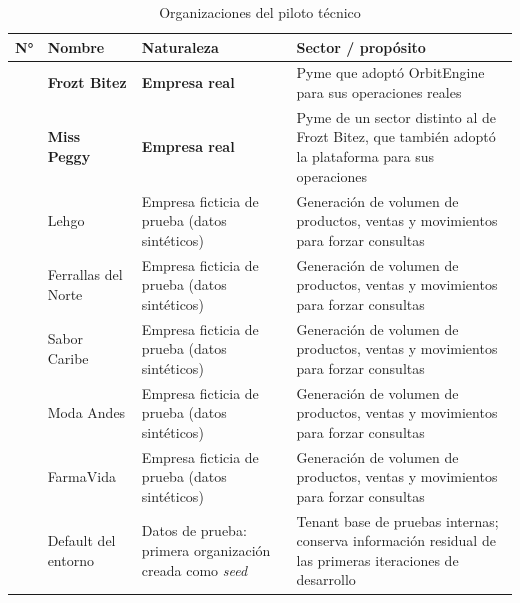 \begin{longtable}[]{@{}
  >{\raggedright\arraybackslash}p{}
  >{\raggedright\arraybackslash}p{}
  >{\raggedright\arraybackslash}p{}
  >{\raggedright\arraybackslash}p{}@{}}
\caption[Organizaciones del piloto técnico]{Organizaciones del piloto técnico}\tabularnewline
\toprule\noalign{}
\begin{minipage}[b]{\linewidth}\raggedright
N°
\end{minipage} & \begin{minipage}[b]{\linewidth}\raggedright
Nombre
\end{minipage} & \begin{minipage}[b]{\linewidth}\raggedright
Naturaleza
\end{minipage} & \begin{minipage}[b]{\linewidth}\raggedright
Sector / propósito
\end{minipage} \\
\midrule\noalign{}
\endhead
\bottomrule\noalign{}
\endlastfoot
1 & \textbf{Frozt Bitez} & \textbf{Empresa real} & Pyme que adoptó OrbitEngine para sus operaciones reales \\
2 & \textbf{Miss Peggy} & \textbf{Empresa real} & Pyme de un sector distinto al de Frozt Bitez, que también adoptó la plataforma para sus operaciones \\
3 & Lehgo & Empresa ficticia de prueba (datos sintéticos) & Generación de volumen de productos, ventas y movimientos para forzar consultas \\
4 & Ferrallas del Norte & Empresa ficticia de prueba (datos sintéticos) & Generación de volumen de productos, ventas y movimientos para forzar consultas \\
5 & Sabor Caribe & Empresa ficticia de prueba (datos sintéticos) & Generación de volumen de productos, ventas y movimientos para forzar consultas \\
6 & Moda Andes & Empresa ficticia de prueba (datos sintéticos) & Generación de volumen de productos, ventas y movimientos para forzar consultas \\
7 & FarmaVida & Empresa ficticia de prueba (datos sintéticos) & Generación de volumen de productos, ventas y movimientos para forzar consultas \\
8 & Default del entorno & Datos de prueba: primera organización creada como \emph{seed} & Tenant base de pruebas internas; conserva información residual de las primeras iteraciones de desarrollo \\
\end{longtable}

